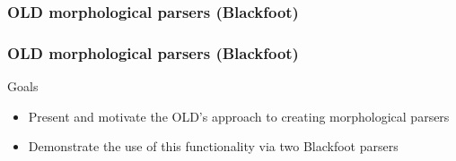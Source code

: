 \documentclass{beamer}
\begin{document}



\subsubsection[Blackfoot]{OLD morphological parsers (Blackfoot)}

\begin{frame}
\frametitle{OLD morphological parsers (Blackfoot)}
Goals
\begin{itemize}
    \item Present and motivate the OLD's approach to creating morphological parsers
    \item Demonstrate the use of this functionality via two Blackfoot parsers
\end{itemize}
\end{frame}
\end{document}
